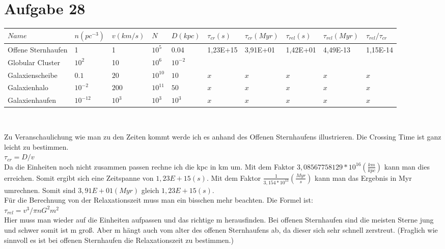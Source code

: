 \section{Aufgabe 28}

\begin{center}
\begin{tabular}{|l|l|l|l|l|l|l|l|l|l|}
\hline
\(Name\) & $n(pc^{-3})$ & $v(km/s)$ & $N$ & $D(kpc)$ & $\tau_{cr}(s)$ & $\tau_{cr}(Myr)$ & $\tau_{rel}(s)$ & $\tau_{rel}(Myr)$ & $\tau_{rel}/\tau_{cr}$ \\
\hline
Offene Sternhaufen & 1 & 1 & $10^5$ & 0.04 & 1,23E+15 & 3,91E+01 & 1,42E+01 & 4,49E-13 & 1,15E-14\\
\hline
Globular Cluster & $10^2$ & 10 & $10^6$ & $10^{-2}$ & & & & & \\
\hline
Galaxienscheibe & $0.1$ & $20$ & $10^{10}$ & $10$ & $x$ & $x$ & $x$ & $x$ & $x$ \\
\hline
Galaxienhalo & $10^{-2}$ & $200$ & $10^{11}$ & $50$ & $x$ & $x$ & $x$ & $x$ & $x$ \\
\hline
Galaxienhaufen & $10^{-12}$ & $10^3$ & $10^3$ & $10^3$ & $x$ & $x$ & $x$ & $x$ & $x$\\
\hline
\end{tabular}\\
\end{center}
Zu Veranschaulichung wie man zu den Zeiten kommt werde ich es anhand des Offenen Sternhaufens illustrieren. 
Die Crossing Time ist ganz leicht zu bestimmen.\\
$\tau_{cr} = D/v$\\
Da die Einheiten noch nicht zusammen passen rechne ich die kpc in km um. Mit dem Faktor $3,08567758129*10^{16} (\frac{km}{kpc})$ kann man dies erreichen. Somit ergibt sich eine Zeitspanne von $1,23E+15 (s)$. Mit dem Faktor $\frac{1}{3,154*10^{13}} (\frac{Myr}{s})$ kann man das Ergebnis in Myr umrechnen.
Somit sind $3,91E+01 (Myr)$ gleich $1,23E+15 (s)$.\\
Für die Berechnung von der Relaxationszeit muss man ein bisschen mehr beachten. Die Formel ist:\\
$\tau_{rel} = v^3/\pi n G^2 m^2$\\
Hier muss man wieder auf die Einheiten aufpassen und das richtige m herausfinden. Bei offenen Sternhaufen sind die meisten Sterne jung und schwer somit ist m groß. Aber m hängt auch vom alter des offenen Sternhaufens ab, da dieser sich sehr schnell zerstreut. (Fraglich wie sinnvoll es ist bei offenen Sternhaufen die Relaxationszeit zu bestimmen.) 
